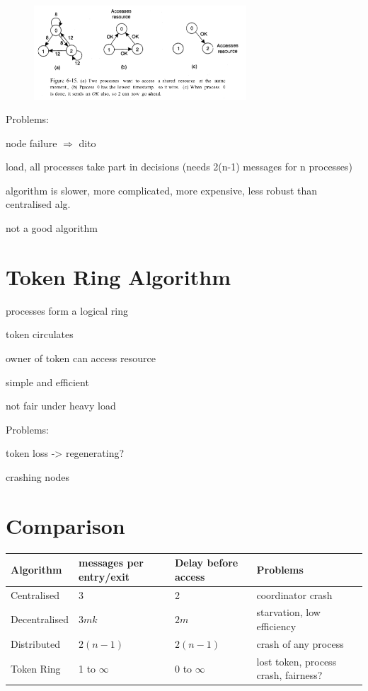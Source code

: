\documentclass[ngerman,a4paper]{report}
\begin{document}
\begin{figure}[h]
	\centering
	\includegraphics[width=300px]{gfx/mutex-distributed.png}
	\label{img:mutex-distributed}
\end{figure}


Problems:
\begin{compactitem}
	\item node failure $\Rightarrow$ dito
    \item load, all processes take part in decisions (needs 2(n-1) messages for n processes)
	\item algorithm is slower, more complicated, more expensive, less robust than centralised alg.
	\item not a good algorithm
\end{compactitem}

\section{Token Ring Algorithm}

\begin{compactitem}
	\item processes form a logical ring
	\item token circulates
	\item owner of token can access resource
	\item simple and efficient
	\item not fair under heavy load
\end{compactitem}
Problems:\begin{compactitem}
	\item token loss -> regenerating?
	\item crashing nodes
\end{compactitem}

\section{Comparison}
\begin{tabular} {l|l|l|l}
Algorithm&messages per entry/exit&Delay before access&Problems\\
\hline
Centralised& 3& 2&coordinator crash\\
Decentralised&$3mk$&$2m$&starvation, low efficiency\\
Distributed&$2(n-1)$&$2(n-1)$&crash of any process\\
Token Ring& 1 to $\infty$&$0$ to $\infty$&lost token, process crash, fairness?
\end{tabular}
\end{document}
